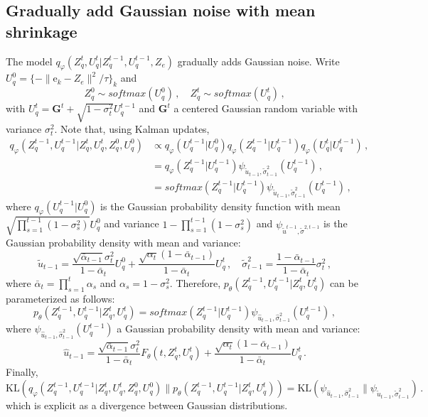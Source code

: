 \documentclass{article}
\newcommand{\rme}{\mathrm{e}}
\begin{document}
\subsection{Gradually add Gaussian noise with mean shrinkage}
The model $q_{\varphi}(Z_q^t ,U_q^t| Z_q^{t-1},U_q^{t-1}, Z_e)$ gradually adds Gaussian noise. Write $U_q^0 = \{- \| \rme_k - Z_e\|^2/ \tau\}_k $ and
$$
Z_q^0 \sim softmax(U_q^0 )\,, \quad Z_q^t \sim softmax(U_q^t)\,,
$$
with $U_q^t = \mathbf{G}^t + \sqrt{1-\sigma_t^2}U_q^{t-1}$ and $\mathbf{G}^t$ a centered Gaussian random variable with variance $\sigma_t^2$.
Note that, using Kalman updates,
\begin{align*}
q_\varphi(Z_q^{t-1},U_q^{t-1}|Z_q^t,U_q^{t},Z_q^0,U_q^{0}) &\propto q_\varphi(U_q^{t-1}|U_q^{0}) q_\varphi(Z_q^{t-1}|U_q^{t-1})q_\varphi(U_q^{t}|U_q^{t-1})\,,\\
&= q_\varphi(Z_q^{t-1}|U_q^{t-1})\psi_{\tilde u_{t-1},\tilde \sigma_{t-1}^2}(U_q^{t-1})\,,\\
&= softmax(Z_q^{t-1}|U_q^{t-1})\psi_{\tilde u_{t-1},\tilde \sigma_{t-1}^2}(U_q^{t-1})\,,
\end{align*}
where $q_\varphi(U_q^{t-1}|U_q^{0})$ is the Gaussian probability density function with mean $ \sqrt{\prod_{s=1}^{t-1}(1-\sigma_s^2)}U_q^0$ and variance $1 - \prod_{s=1}^{t-1}(1-\sigma_s^2)$ and $\psi_{\tilde u^{t-1},\tilde \sigma^{2,t-1}}$ is the Gaussian probability density with mean and variance:
$$
\tilde u_{t-1} = \frac{\sqrt{\bar{\alpha}_{t-1}}\sigma_t^2}{1 - \bar{\alpha}_{t}}U_q^0 + \frac{\sqrt{\alpha_t}(1-\bar{\alpha}_{t-1})}{1-\bar{\alpha}_{t}}U_q^t\,,\quad \tilde \sigma_{t-1}^2 = \frac{1 - \bar{\alpha}_{t-1}}{1 - \bar{\alpha}_{t}}\sigma_t^2\,,
$$
where $ \bar{\alpha}_{t} = \prod_{s=1}^{t}\alpha_s$ and $\alpha_s = 1-\sigma_s^2$. Therefore, $p_\theta(Z_q^{t-1},U_q^{t-1}|Z_q^t,U_q^t)$ can be parameterized as follows:
$$
p_\theta(Z_q^{t-1},U_q^{t-1}|Z_q^t,U_q^t) = softmax(Z_q^{t-1}|U_q^{t-1})\psi_{\hat u_{t-1},\hat \sigma_{t-1}^2}(U_q^{t-1})\,,
$$
where $\psi_{\hat u_{t-1},\hat \sigma_{t-1}^2}(U_q^{t-1})$ a Gaussian probability density with mean and variance:
$$
\hat u_{t-1} = \frac{\sqrt{\bar{\alpha}_{t-1}}\sigma_t^2}{1 - \bar{\alpha}_{t}}F_\theta(t,Z_q^t,U_q^t) + \frac{\sqrt{\alpha_t}(1-\bar{\alpha}_{t-1})}{1-\bar{\alpha}_{t}}U_q^t \,.
$$
Finally,
$$
\mathrm{KL}(q_\varphi(Z_q^{t-1},U_q^{t-1}|Z_q^t,U_q^{t},Z_q^0,U_q^{0})\|p_\theta(Z_q^{t-1},U_q^{t-1}|Z_q^t,U_q^t)) = \mathrm{KL}(\psi_{\hat u_{t-1},\hat \sigma_{t-1}^2}\|\psi_{\tilde u_{t-1},\tilde \sigma_{t-1}^2})\,.
$$
which is explicit as a divergence between Gaussian distributions.
\end{document}
